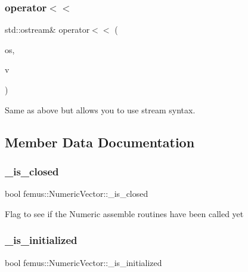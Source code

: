 \subsubsection{\texorpdfstring{operator$<$$<$}{operator<<}}
{\footnotesize\ttfamily std\+::ostream\& operator$<$$<$ (\begin{DoxyParamCaption}\item[{std\+::ostream \&}]{os,  }\item[{const \mbox{\hyperlink{classfemus_1_1_numeric_vector}{Numeric\+Vector}} \&}]{v }\end{DoxyParamCaption})\hspace{0.3cm}{\ttfamily [friend]}}

Same as above but allows you to use stream syntax. 

\subsection{Member Data Documentation}
\mbox{\label{classfemus_1_1_numeric_vector_a722d2654319ad192949d9f844975e80e}} 
\subsubsection{\texorpdfstring{\+\_\+is\+\_\+closed}{\_is\_closed}}
{\footnotesize\ttfamily bool femus\+::\+Numeric\+Vector\+::\+\_\+is\+\_\+closed\hspace{0.3cm}{\ttfamily [protected]}}

Flag to see if the Numeric assemble routines have been called yet \mbox{\label{classfemus_1_1_numeric_vector_a1c0db787810e7c4b7d385da57081790a}} 
\subsubsection{\texorpdfstring{\+\_\+is\+\_\+initialized}{\_is\_initialized}}
{\footnotesize\ttfamily bool femus\+::\+Numeric\+Vector\+::\+\_\+is\+\_\+initialized\hspace{0.3cm}{\ttfamily [protected]}}

